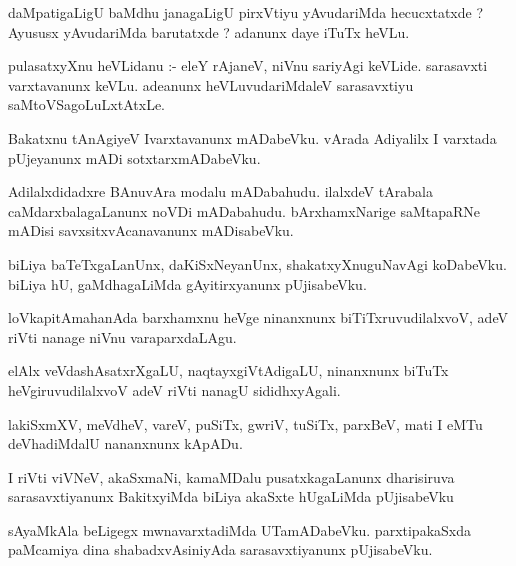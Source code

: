 \documentclass{article}
\begin{document}
\begin{mn}
daMpatigaLigU  baMdhu  janagaLigU  pirxVtiyu  yAvudariMda  hecucxtatxde ?  Ayususx  yAvudariMda  barutatxde ?  
adanunx  daye  iTuTx  heVLu.
\end{mn}

\begin{mn}
pulasatxyXnu  heVLidanu :- eleY  rAjaneV,  niVnu  sariyAgi  keVLide.  sarasavxti  varxtavanunx  keVLu.  adeanunx  
heVLuvudariMdaleV  sarasavxtiyu  saMtoVSagoLuLxtAtxLe.
\end{mn}

\begin{mn}
Bakatxnu  tAnAgiyeV  Ivarxtavanunx  mADabeVku.  vArada  Adiyalilx  I varxtada  pUjeyanunx  mADi  sotxtarxmADabeVku.  
\end{mn}

\begin{mn}
Adilalxdidadxre  BAnuvAra  modalu  mADabahudu.  ilalxdeV  tArabala  caMdarxbalagaLanunx  noVDi  mADabahudu.  bArxhamxNarige  
saMtapaRNe  mADisi  savxsitxvAcanavanunx  mADisabeVku.
\end{mn}

\begin{mn}
biLiya  baTeTxgaLanUnx,  daKiSxNeyanUnx,  shakatxyXnuguNavAgi  koDabeVku.  biLiya  hU,  gaMdhagaLiMda  gAyitirxyanunx  pUjisabeVku. 
\end{mn}

\begin{mn}
loVkapitAmahanAda  barxhamxnu  heVge  ninanxnunx  biTiTxruvudilalxvoV,  adeV  riVti  nanage  niVnu  varaparxdaLAgu.
\end{mn}

\begin{mn}
elAlx  veVdashAsatxrXgaLU,  naqtayxgiVtAdigaLU,  ninanxnunx  biTuTx  heVgiruvudilalxvoV  adeV  riVti  nanagU  sididhxyAgali.
\end{mn}

\begin{mn}
lakiSxmXV,  meVdheV,  vareV,  puSiTx,  gwriV,  tuSiTx,  parxBeV,  mati  I eMTu  deVhadiMdalU  nananxnunx  kApADu.  
\end{mn}

\begin{mn}
I riVti  viVNeV,  akaSxmaNi,  kamaMDalu  pusatxkagaLanunx  dharisiruva  sarasavxtiyanunx  BakitxyiMda  biLiya  
akaSxte  hUgaLiMda  pUjisabeVku
\end{mn}

\begin{mn}
sAyaMkAla  beLigegx  mwnavarxtadiMda  UTamADabeVku.  parxtipakaSxda  paMcamiya  dina  shabadxvAsiniyAda  sarasavxtiyanunx  pUjisabeVku.
\end{mn}
\end{document}
